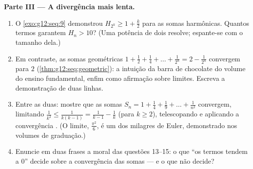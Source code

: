 \begin{problem}
\medskip
\noindent\textbf{Parte III --- A divergência mais lenta.}
\begin{enumerate}[resume]
  \item O \cref{exo:g12:seq:9} demonstrou
        $H_{2^k} \geq 1 + \frac k2$ para as somas harmônicas.
        Quantos termos garantem $H_n > 10$? (Uma potência de dois
        resolve; espante-se com o tamanho dela.)
  \item Em contraste, as somas geométricas
        $1 + \frac12 + \frac14 + \dots + \frac{1}{2^n} =
        2 - \frac{1}{2^n}$ convergem para $2$
        (\cref{thm:g12:seq:geometric}): a intuição da barra de
        chocolate do volume do ensino fundamental, enfim como
        afirmação sobre limites. Escreva a demonstração de duas
        linhas.
  \item Entre as duas: mostre que as somas
        $S_n = 1 + \frac{1}{4} + \frac{1}{9} + \dots +
        \frac{1}{n^2}$ convergem, limitando
        $\frac{1}{k^2} \leq \frac{1}{k(k-1)} =
        \frac{1}{k-1} - \frac{1}{k}$ (para $k \geq 2$),
        telescopando e aplicando a convergência . (O
        limite, $\frac{\pi^2}{6}$, é um dos milagres de Euler,
        demonstrado nos volumes de graduação.)
  \item Enuncie em duas frases a moral das questões 13--15: o que
        ``os termos tendem a $0$'' decide sobre a convergência
        das somas --- e o que não decide?
\end{enumerate}


\end{problem}
